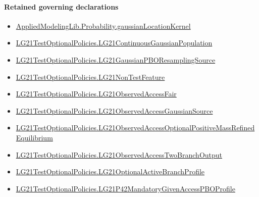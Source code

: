 \documentclass[10pt]{article}
\begin{document}
\paragraph{Retained governing declarations}
\begin{itemize}\raggedright
\item \hyperlink{governing-declaration-6c289c06beead2ba}{Applied\allowbreak{}Modeling\allowbreak{}Lib.\allowbreak{}Probability.\allowbreak{}gaussian\allowbreak{}Location\allowbreak{}Kernel}
\item \hyperlink{paper-prerequisite-f5e1c886d250142b}{LG21\allowbreak{}Test\allowbreak{}Optional\allowbreak{}Policies.\allowbreak{}LG21\allowbreak{}Continuous\allowbreak{}Gaussian\allowbreak{}Population}
\item \hyperlink{governing-declaration-c8b98fdcfb30482e}{LG21\allowbreak{}Test\allowbreak{}Optional\allowbreak{}Policies.\allowbreak{}LG21\allowbreak{}Gaussian\allowbreak{}PBO\allowbreak{}Resampling\allowbreak{}Source}
\item \hyperlink{governing-declaration-81cb73bf3869c56d}{LG21\allowbreak{}Test\allowbreak{}Optional\allowbreak{}Policies.\allowbreak{}LG21\allowbreak{}Non\allowbreak{}Test\allowbreak{}Feature}
\item \hyperlink{governing-declaration-cf5f3565b859b137}{LG21\allowbreak{}Test\allowbreak{}Optional\allowbreak{}Policies.\allowbreak{}LG21\allowbreak{}Observed\allowbreak{}Access\allowbreak{}Fair}
\item \hyperlink{governing-declaration-2b8ecce015c6e865}{LG21\allowbreak{}Test\allowbreak{}Optional\allowbreak{}Policies.\allowbreak{}LG21\allowbreak{}Observed\allowbreak{}Access\allowbreak{}Gaussian\allowbreak{}Source}
\item \hyperlink{governing-declaration-54d577fbb0a632ec}{LG21\allowbreak{}Test\allowbreak{}Optional\allowbreak{}Policies.\allowbreak{}LG21\allowbreak{}Observed\allowbreak{}Access\allowbreak{}Optional\allowbreak{}Positive\allowbreak{}Mass\allowbreak{}Refined\allowbreak{}Equilibrium}
\item \hyperlink{governing-declaration-f2c986c14a1e4187}{LG21\allowbreak{}Test\allowbreak{}Optional\allowbreak{}Policies.\allowbreak{}LG21\allowbreak{}Observed\allowbreak{}Access\allowbreak{}Two\allowbreak{}Branch\allowbreak{}Output}
\item \hyperlink{governing-declaration-4f1e0bb5ec5b1259}{LG21\allowbreak{}Test\allowbreak{}Optional\allowbreak{}Policies.\allowbreak{}LG21\allowbreak{}Optional\allowbreak{}Active\allowbreak{}Branch\allowbreak{}Profile}
\item \hyperlink{governing-declaration-90af79878db4d892}{LG21\allowbreak{}Test\allowbreak{}Optional\allowbreak{}Policies.\allowbreak{}LG21\allowbreak{}P42\allowbreak{}Mandatory\allowbreak{}Given\allowbreak{}Access\allowbreak{}PBO\allowbreak{}Profile}

\end{itemize}
\end{document}

